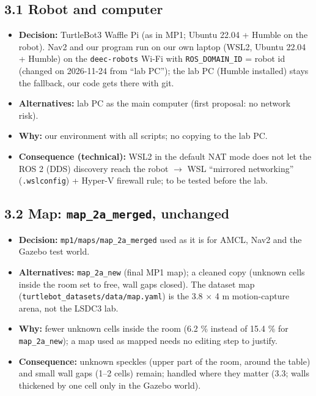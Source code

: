 \documentclass[10pt]{article}
\newcommand{\pkg}[1]{\texttt{#1}}
\begin{document}
\subsection*{3.1 Robot and computer}
\begin{itemize}
  \item \textbf{Decision:} TurtleBot3 Waffle Pi (as in MP1; Ubuntu 22.04 + Humble on the robot). Nav2 and our program run on our own laptop (WSL2, Ubuntu 22.04 + Humble) on the \pkg{deec-robots} Wi-Fi with \pkg{ROS\_DOMAIN\_ID} = robot id (changed on 2026-11-24 from ``lab PC''); the lab PC (Humble installed) stays the fallback, our code gets there with git.
  \item \textbf{Alternatives:} lab PC as the main computer (first proposal: no network risk).
  \item \textbf{Why:} our environment with all scripts; no copying to the lab PC.
  \item \textbf{Consequence (technical):} WSL2 in the default NAT mode does not let the ROS 2 (DDS) discovery reach the robot $\rightarrow$ WSL ``mirrored networking'' (\pkg{.wslconfig}) + Hyper-V firewall rule; to be tested before the lab.
\end{itemize}

\subsection*{3.2 Map: \pkg{map\_2a\_merged}, unchanged}
\begin{itemize}
  \item \textbf{Decision:} \pkg{mp1/maps/map\_2a\_merged} used as it is for AMCL, Nav2 and the Gazebo test world.
  \item \textbf{Alternatives:} \pkg{map\_2a\_new} (final MP1 map); a cleaned copy (unknown cells inside the room set to free, wall gaps closed). The dataset map (\pkg{turtlebot\_datasets/data/map.yaml}) is the 3.8 $\times$ 4 m motion-capture arena, not the LSDC3 lab.
  \item \textbf{Why:} fewer unknown cells inside the room (6.2 \% instead of 15.4 \% for \pkg{map\_2a\_new}); a map used as mapped needs no editing step to justify.
  \item \textbf{Consequence:} unknown speckles (upper part of the room, around the table) and small wall gaps (1--2 cells) remain; handled where they matter (3.3; walls thickened by one cell only in the Gazebo world).
\end{itemize}
\end{document}
